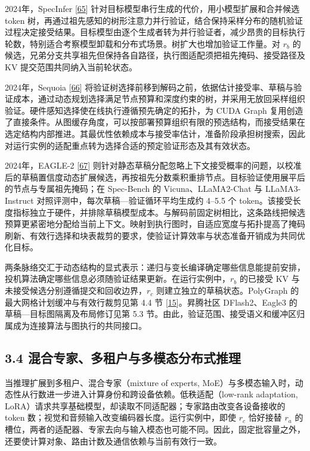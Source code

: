 \documentclass[UTF8,10.5pt,fontset=windows]{ctexart}
\begin{document}
2024年，SpecInfer {[}\protect\hyperlink{ref-miao2024specinfer}{65}{]}
针对目标模型串行生成的代价，用小模型扩展和合并候选 token
树，再通过祖先感知的树形注意力并行验证，结合保持采样分布的随机验证过程决定接受结果。目标模型由逐个生成者转为并行验证者，减少昂贵的目标执行轮数，特别适合考察模型卸载和分布式场景。树扩大也增加验证工作量。对
\(r_b\)
的候选，兄弟分支共享祖先但保持各自路径，执行图适配须把祖先掩码、接受路径及
KV 提交范围共同纳入当前轮状态。

2024年，Sequoia {[}\protect\hyperlink{ref-chen2024sequoia}{66}{]}
将验证树选择前移到解码之前，依据估计接受率、草稿与验证成本，通过动态规划选择满足节点预算和深度约束的树，并采用无放回采样组织验证。硬件感知选择使在线执行遵循预先确定的拓扑，为
CUDA Graph
复用创造了直接条件。从图缓存角度，可以按部署预算组织有限的预选结构，而接受结果在选定结构内部推进。其最优性依赖成本与接受率估计，准备阶段承担树搜索，因此对运行实例的适配重点转为选择合适的预定验证形态及其有效状态。

2024年，EAGLE-2 {[}\protect\hyperlink{ref-li2024eagle2}{67}{]}
则针对静态草稿分配忽略上下文接受概率的问题，以校准后的草稿置信度动态扩展候选，再按祖先分数乘积重排节点。目标验证使用展平后的节点与专属祖先掩码；在
Spec-Bench 的 Vicuna、LLaMA2-Chat 与 LLaMA3-Instruct
对照评测中，每次草稿---验证循环平均生成约 4--5.5 个
token。该接受长度指标独立于硬件，并排除草稿模型成本。与解码前固定树相比，这条路线把候选预算更紧密地分配给当前上下文。映射到执行图时，自适应宽度与拓扑提高了掩码刷新、有效行选择和块表裁剪的要求，使验证计算效率与状态准备开销成为共同优化目标。

两条脉络交汇于动态结构的显式表示：递归与变长编译确定哪些信息能提前安排，投机算法确定哪些信息必须随验证结果更新。在运行实例中，\(r_b\)
的已接受 KV 与未接受候选分别遵循提交和回收边界，\(r_c\)
则建立独立的草稿状态。PolyGraph 的最大网格计划缓冲与有效行裁剪见第 4.4
节 {[}\protect\hyperlink{ref-yang2026polygraph}{15}{]}。昇腾社区
DFlash2、Eagle3 的草稿---目标图隔离及布局修订见第 5.3
节。由此，验证范围、接受语义和缓冲区归属成为连接算法与图执行的共同接口。

\hypertarget{section-3-4}{%
\subsection{3.4 混合专家、多租户与多模态分布式推理}\label{section-3-4}}

当推理扩展到多租户、混合专家（mixture of experts,
MoE）与多模态输入时，动态性从行数进一步进入计算身份和跨设备依赖。低秩适配（low-rank
adaptation,
LoRA）请求共享基础模型，却读取不同适配器；专家路由改变各设备接收的 token
数；视觉和音频输入改变编码器长度。运行实例中，即使 \(r_c\) 恰好接替
\(r_a\)
的槽位，两者的适配器、专家去向与输入模态也可能不同。因此，固定批容量之外，还要使计算对象、路由计数及通信依赖与当前有效行一致。
\end{document}
